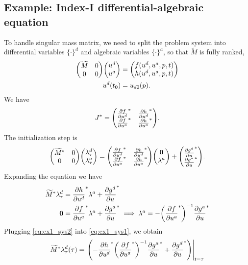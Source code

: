 \documentclass[a4paper,9pt]{article}
\theoremstyle{definition}
\theoremstyle{remark}
\begin{document}
\subsection{Example: Index-I differential-algebraic equation}
To handle singular mass matrix, we need to split the problem system into
differential variables $\{\cdot\}^d$ and algebraic
variables $\{\cdot\}^a$, so that $\widetilde{M}$ is fully ranked,
\begin{align}
  \mqty(\widetilde{M} & 0 \\ 0 & 0) \mqty(u^d\\ u^a) &= \mqty(f(u^d, u^a, p, t)
  \\ h(u^d, u^a, p, t)) \\
  u^d(t_0) &= u_{d0}(p).
\end{align}
We have
\begin{equation}
  J^* = \mqty(\pdv{f}{u^d}^* & \pdv{h}{u^d}^* \\ \pdv{f}{u^a}^* &
  \pdv{h}{u^a}^*).
\end{equation}
The initialization step is
\begin{equation}
  \mqty(\widetilde{M}^* & 0 \\ 0 & 0) \mqty(\lambda_\tau^d\\ \lambda_\tau^a) =
  \mqty(\pdv{f}{u^d}^* & \pdv{h}{u^d}^* \\ \pdv{f}{u^a}^* &
  \pdv{h}{u^a}^*) \mqty(\bm{0}\\ \lambda^a) + \mqty(\pdv{g^d}{u}^* \\
  \pdv{g^a}{u}^*).
\end{equation}
Expanding the equation we have
\begin{align}
  \widetilde{M}^* \lambda_\tau^d &= \pdv{h}{u^d}^* \lambda^a + \pdv{g^d}{u}^*
  \label{eq:ex1_sys1} \\
  \bm{0} &= \pdv{f}{u^a}^* \lambda^a + \pdv{g^a}{u}^* \implies
  \lambda^a = -\qty(\pdv{f}{u^a}^*)^{-1}\pdv{g^a}{u}^* \label{eq:ex1_sys2}
\end{align}
Plugging \cref{eq:ex1_sys2} into \cref{eq:ex1_sys1}, we obtain
\begin{equation}
  \widetilde{M}^* \lambda_\tau^d(\tau) = \eval{\qty(-\pdv{h}{u^d}^*
    \qty(\pdv{f}{u^a}^*)^{-1}\pdv{g^a}{u}^* +
  \pdv{g^d}{u}^*)}_{t=\tau}
\end{equation}
\end{document}
